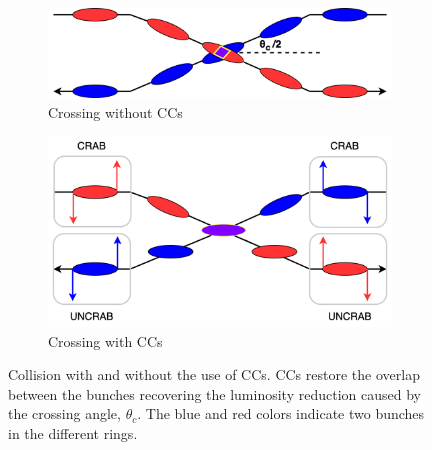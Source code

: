 \begin{figure}[!ht]
    \centering
    \begin{subfigure}[t]{0.45\textwidth}
        \centering
        \includegraphics[width=1\textwidth]{images/introduction/crossing_no_CCs.png}
        \caption{Crossing without CCs}
    \end{subfigure}
    \vfill
    \begin{subfigure}[t]{0.45\textwidth}
        \centering
        \includegraphics[width=1\textwidth]{images/introduction/crossing_CCs.png}
        \caption{Crossing with CCs}
    \end{subfigure}
    \hfill
     \caption{Collision with and without the use of CCs.%
     CCs restore the overlap between the bunches recovering the luminosity reduction caused by the crossing angle, $\theta_c$. The blue and red colors indicate two bunches in the different rings.} 
     \label{fig:crossing_with_and_without_CCs}
 \end{figure}


